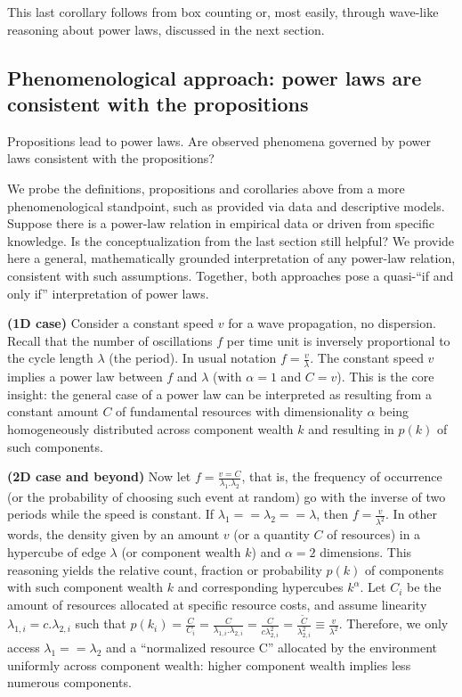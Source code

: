 \documentclass[a4paper, 11pt]{article} %
\begin{document}
This last corollary follows from box counting or, most easily,
through wave-like reasoning about power laws, discussed in the next section.

\subsection{Phenomenological approach: power laws are consistent with the propositions}\label{sec:phen}

Propositions lead to power laws. Are observed phenomena governed by power laws consistent with the propositions?

We probe the definitions, propositions and corollaries above from a more phenomenological standpoint, such as provided via data and descriptive models. Suppose there is a power-law relation in empirical data or driven from specific knowledge. Is the conceptualization
from the last section still helpful? We provide here a general, mathematically grounded interpretation of any power-law relation,
consistent with such assumptions.
Together, both approaches pose a quasi-``if and only if''
interpretation of power laws.

{\bf (1D case)} Consider a constant speed $v$ for a wave propagation, no dispersion.
Recall that the number of oscillations $f$ per time unit is
inversely proportional to the cycle length $\lambda$ (the period).
In usual notation $f=\frac{v}{\lambda}$.
The constant speed $v$ implies a power law between 
$f$ and $\lambda$ (with $\alpha=1$ and $C=v$).
This is the core insight: the general case of a power law can
be interpreted as resulting from a constant amount $C$ of
fundamental resources with dimensionality $\alpha$ 
being homogeneously distributed across
component wealth $k$ and resulting in $p(k)$ of such components.

{\bf (2D case and beyond)} Now let $f=\frac{v=C}{\lambda_1 . \lambda_2}$, that is, the frequency of occurrence
(or the probability of choosing such event at random) go with the inverse of two periods while the speed is constant. 
If $\lambda_1==\lambda_2==\lambda$, then $f=\frac{v}{\lambda^2}$.
In other words, the density given by an amount $v$
(or a quantity $C$ of resources) in a hypercube of
edge $\lambda$ (or component wealth $k$)
and $\alpha=2$ dimensions.
This reasoning yields the relative count, fraction or probability $p(k)$ of components with such component wealth $k$ and corresponding hypercubes $k^\alpha$.
Let $C_i$ be the amount of resources allocated at
specific resource costs,
and assume linearity $\lambda_{1,i}=c.\lambda_{2,i}$
such that
$p(k_i)=\frac{C}{C_i}=\frac{C}{\lambda_{1,i}.\lambda_{2,i}}=
\frac{C}{c\lambda_{2,i}^2}=\frac{\widetilde{C}}{\lambda_{2,i}^2}\equiv\frac{v}{\lambda^2}$.
Therefore, we only access $\lambda_1==\lambda_2$ and a ``normalized resource C'' allocated by the environment uniformly across component wealth: higher component wealth implies less numerous components. 
\end{document}
